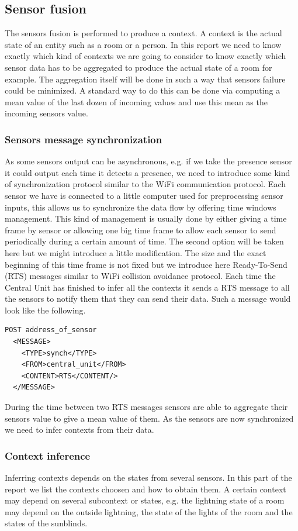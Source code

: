 \documentclass{acm_proc_article-sp}
\begin{document}
\subsection{Sensor fusion}
The sensors fusion is performed to produce a context. A context is the actual state of an entity such as a room or a person. 
In this report we need to know exactly which kind of contexts we are going to consider to know exactly which sensor data has to be aggregated to produce the actual state of a room for example. 
The aggregation itself will be done in such a way that sensors failure could be minimized.
A standard way to do this can be done via computing a mean value of the last dozen of incoming values and use this mean as the incoming sensors value.
\subsubsection{Sensors message synchronization}
As some sensors output can be asynchronous, e.g. if we take the presence sensor it could output each time it detects a presence, we need to introduce some kind of synchronization protocol similar to the WiFi communication protocol.
Each sensor we have is connected to a little computer used for preprocessing sensor inputs, this allows us to synchronize the data flow by offering time windows management.
This kind of management is usually done by either giving a time frame by sensor or allowing one big time frame to allow each sensor to send periodically during a certain amount of time.
The second option will be taken here but we might introduce a little modification. 
The size and the exact beginning of this time frame is not fixed but we introduce here Ready-To-Send (RTS) messages similar to WiFi collision avoidance protocol.
Each time the Central Unit has finished to infer all the contexts it sends a RTS message to all the sensors to notify them that they can send their data.
Such a message would look like the following.
\begin{verbatim}
POST address_of_sensor 
  <MESSAGE>
    <TYPE>synch</TYPE>
    <FROM>central_unit</FROM>
    <CONTENT>RTS</CONTENT/>
  </MESSAGE> 
\end{verbatim}
During the time between two RTS messages sensors are able to aggregate their sensors value to give a mean value of them.
As the sensors are now synchronized we need to infer contexts from their data.
\subsubsection{Context inference}
Inferring contexts depends on the states from several sensors. In this part of the report we list the contexts choosen and how to obtain them.
A certain context may depend on several subcontext or states, 
e.g. the lightning state of a room may depend on the outside lightning, the state of the lights of the room and the states of the sunblinds.
\end{document}
